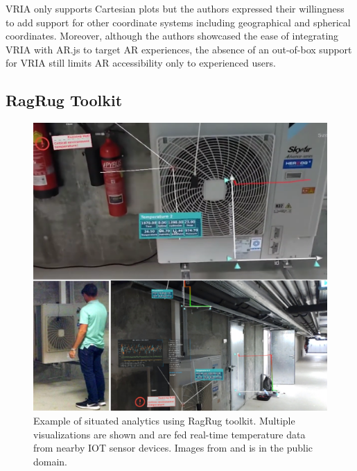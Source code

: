 \documentclass{vgtc}                          %
\begin{document}
\medskip

\noindent VRIA only supports Cartesian plots but the authors expressed their willingness to add support for
other coordinate systems including geographical and spherical coordinates. Moreover, although the authors
showcased the ease of integrating VRIA with AR.js to target AR experiences, the absence of an out-of-box
support for VRIA still limits AR accessibility only to experienced users.

\subsection{RagRug Toolkit}

\begin{figure}[tb]
	\centering
	\includegraphics[width=\columnwidth]{ragrug_example}
	\caption[Caption for RagRug]{Example of situated analytics using RagRug
		toolkit. Multiple visualizations are shown and are fed real-time temperature data from nearby IOT sensor devices.
        Images from \cite{ragrug:repo} and is in the public domain. }
	\label{fig:ragrug_example}
\end{figure}
\end{document}
